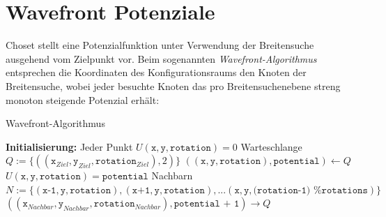 \section{Wavefront Potenziale}

Choset stellt eine Potenzialfunktion unter Verwendung der Breitensuche ausgehend vom Zielpunkt vor. Beim sogenannten \textit{Wavefront-Algorithmus} entsprechen die Koordinaten des Konfigurationsraums den Knoten der Breitensuche, wobei jeder besuchte Knoten das pro Breitensuchenebene streng monoton steigende Potenzial erhält: \cite{choset.2007}
\begin{algorithm}
\caption{Wavefront-Algorithmus}
	\begin{algorithmic}[1]
  \State \textbf{Initialisierung:}
  \State \hspace{\algorithmicindent} Jeder Punkt $U(\texttt{x}, \texttt{y}, \texttt{rotation}) = 0$
  \State \hspace{\algorithmicindent} Warteschlange $Q := \{((\texttt{x}_{Ziel}, \texttt{y}_{Ziel}, \texttt{rotation}_{Ziel}), 2)\}$
		\vspace*{0.3cm}
      \State $((\texttt{x}, \texttt{y}, \texttt{rotation}), \texttt{potential}) \gets Q$
      \State $U(\texttt{x}, \texttt{y}, \texttt{rotation}) = \texttt{potential}$
      \State Nachbarn $N := \{(\texttt{x-1}, \texttt{y}, \texttt{rotation}), (\texttt{x+1}, \texttt{y}, \texttt{rotation}), ... (\texttt{x}, \texttt{y}, \texttt{(rotation-1) \% rotations})\}$
              \State $((\texttt{x}_{Nachbar}, \texttt{y}_{Nachbar}, \texttt{rotation}_{Nachbar}), \texttt{potential + 1}) \rightarrow Q$
          \EndIf
      \EndFor
  \EndWhile
	\end{algorithmic}
\end{algorithm}

